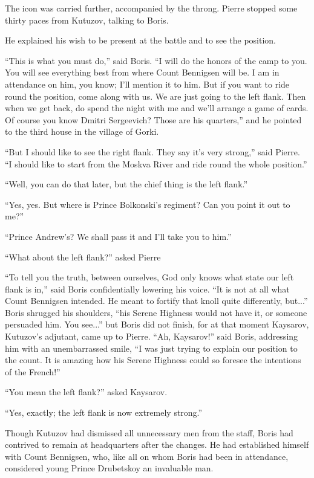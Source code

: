 The icon was carried further, accompanied by the throng. Pierre
stopped some thirty paces from Kutuzov, talking to Boris.

He explained his wish to be present at the battle and to see the
position.

``This is what you must do,'' said Boris. ``I will do the honors
of the camp to you. You will see everything best from where Count
Bennigsen will be. I am in attendance on him, you know; I'll
mention it to him.  But if you want to ride round the position,
come along with us. We are just going to the left flank. Then
when we get back, do spend the night with me and we'll arrange a
game of cards. Of course you know Dmitri Sergeevich? Those are
his quarters,'' and he pointed to the third house in the village
of Gorki.

``But I should like to see the right flank. They say it's very
strong,'' said Pierre. ``I should like to start from the Moskva
River and ride round the whole position.''

``Well, you can do that later, but the chief thing is the left
flank.''

``Yes, yes. But where is Prince Bolkonski's regiment? Can you
point it out to me?''

``Prince Andrew's? We shall pass it and I'll take you to him.''

``What about the left flank?'' asked Pierre

``To tell you the truth, between ourselves, God only knows what
state our left flank is in,'' said Boris confidentially lowering
his voice. ``It is not at all what Count Bennigsen intended. He
meant to fortify that knoll quite differently, but...'' Boris
shrugged his shoulders, ``his Serene Highness would not have it,
or someone persuaded him. You see...'' but Boris did not finish,
for at that moment Kaysarov, Kutuzov's adjutant, came up to
Pierre. ``Ah, Kaysarov!'' said Boris, addressing him with an
unembarrassed smile, ``I was just trying to explain our position
to the count. It is amazing how his Serene Highness could so
foresee the intentions of the French!''

``You mean the left flank?'' asked Kaysarov.

``Yes, exactly; the left flank is now extremely strong.''

Though Kutuzov had dismissed all unnecessary men from the staff,
Boris had contrived to remain at headquarters after the
changes. He had established himself with Count Bennigsen, who,
like all on whom Boris had been in attendance, considered young
Prince Drubetskoy an invaluable man.


